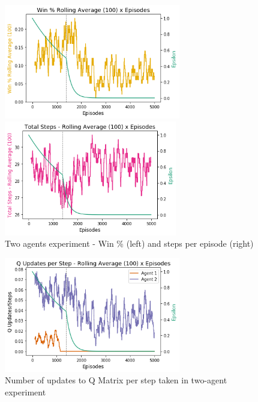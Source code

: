 \documentclass[10pt]{article}
\begin{document}
        \begin{figure}[t]
            \centering
            \begin{minipage}{0.4\textwidth}
                \includegraphics[height=5cm]{Images/exp_2/1_win_percent.png}
            \end{minipage}
            \hfill
            \begin{minipage}{0.4\textwidth}
                \includegraphics[height=5cm]{Images/exp_2/2_total_steps.png}
            \end{minipage}
            \caption{Two agents experiment - Win \% (left) and steps per episode (right)}
            \label{fig:exp2:win}
        \end{figure}

        \begin{figure}[h]
            \centering
            \includegraphics[height=5cm]{Images/exp_2/3_updates_per_step.png}
            \caption{Number of updates to Q Matrix per step taken in two-agent experiment}
            \label{fig:exp2:updates}
        \end{figure}
\end{document}
